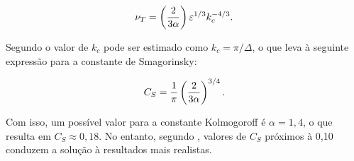 \begin{equation}
    \nu_T=\left({\frac{2}{3\alpha}}\right)\varepsilon^{1/3}k_c^{-4/3}\text{.}
\end{equation}

Segundo  o valor de $k_c$ pode ser estimado como $k_c=\pi/\Delta$, o que leva à seguinte expressão para a constante de Smagorinsky:

\begin{equation}
    C_S=\frac{1}{\pi}\left({\frac{2}{3\alpha}}\right)^{3/4}\text{.}
\end{equation}

Com isso, um possível valor para a constante Kolmogoroff é $\alpha=1,4$, o que resulta em $C_S\approx0,18$. No entanto, segundo  , valores de $C_S$ próximos à 0,10 conduzem a solução à resultados mais realistas.

